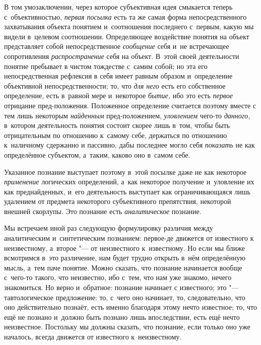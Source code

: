 В том умозаключении, через которое субъективная идея смыкается
теперь с~объективностью, {\em первая
посылка} есть та же самая форма непосредственного
захватывания объекта понятием и~соотношения последнего с~первым, какую мы
видели в~целевом соотношении. Определяющее воздействие понятия на объект
представляет собой непосредственное
{\em сообщение} себя и~не
встречающее сопротивления
{\em распространение}
себя на объект. В~этой своей деятельности понятие пребывает в
чистом тождестве с~самим собой; но эта его непосредственная рефлексия в
себя имеет равным образом и~определение объективной непосредственности; то,
что {\em для него} есть
его собственное определение, есть в~равной мере и~некоторое
{\em бытие,} ибо это есть
{\em первое} отрицание
пред-положения. Положенное определение считается поэтому вместе
с тем лишь некоторым {\em найденным}
пред-положением,
{\em уловлением} чего-то
{\em данного,} в~котором
деятельность понятия состоит скорее лишь в~том, чтобы быть отрицательным по
отношению к~самому себе, держаться по отношению к~наличному сдержанно и
пассивно, дабы последнее могло себя
{\em показать} не как
определённое субъектом, а~таким, каково оно в~самом себе.

Указанное познание выступает поэтому в~этой посылке даже не
как некоторое {\em применение}
логических определений, а~как некоторое получение и~уловление
их как преднайденных, и~его деятельность выступает как ограничивающаяся
лишь удалением от предмета некоторого субъективного препятствия, некоторой
внешней скорлупы. Это познание есть
{\em аналитическое}
познание.


Мы встречаем иной раз следующую формулировку различия между
аналитическим и~синтетическим познанием: первое-де движется от известного к
неизвестному, а~второе "--- от неизвестного к~известному. Но
если мы ближе всмотримся в~это различение, нам будет трудно открыть в~нём
определённую мысль, а~тем паче понятие. Можно сказать, что познание
начинается вообще с~чего-то такого, что неизвестно, ибо с~тем, что нам уже
знакомо, нечего знакомиться. Но верно и~обратное: познание начинает с
известного; это "--- тавтологическое предложение: то, с~чего
оно начинает, то, следовательно, что оно действительно познаёт, есть именно
благодаря этому нечто известное; то, что ещё не познано и~должно быть
познано лишь впоследствии, есть ещё нечто неизвестное. Постольку мы
должны сказать, что познание, если только оно уже началось,
всегда движется от известного к~неизвестному.

